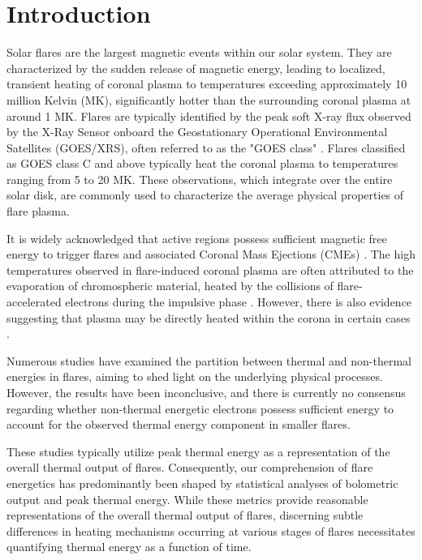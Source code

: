 \justifying

\section{Introduction} \label{sec:intro}

Solar flares are the largest magnetic events within our solar system. They are characterized by the sudden release of magnetic energy, leading to localized, transient heating of coronal plasma to temperatures exceeding approximately 10 million Kelvin (MK), significantly hotter than the surrounding coronal plasma at around 1 MK. Flares are typically identified by the peak soft X-ray flux observed by the X-Ray Sensor onboard the Geostationary Operational Environmental Satellites (GOES/XRS), often referred to as the "GOES class" \citep{xrs}. Flares classified as GOES class C and above typically heat the coronal plasma to temperatures ranging from 5 to 20 MK. These observations, which integrate over the entire solar disk, are commonly used to characterize the average physical properties of flare plasma.

It is widely acknowledged that active regions possess sufficient magnetic free energy to trigger flares and associated Coronal Mass Ejections (CMEs) \citep{emslie12, ash17}. The high temperatures observed in flare-induced coronal plasma are often attributed to the evaporation of chromospheric material, heated by the collisions of flare-accelerated electrons during the impulsive phase \citep{fletcher11}. However, there is also evidence suggesting that plasma may be directly heated within the corona in certain cases \citep[e.g.,][]{longcope11, reeves17}.

Numerous studies \citep{stosire07, emslie12, inglis14, warmuth16a, warmuth16b, ash17} have examined the partition between thermal and non-thermal energies in flares, aiming to shed light on the underlying physical processes. However, the results have been inconclusive, and there is currently no consensus regarding whether non-thermal energetic electrons possess sufficient energy to account for the observed thermal energy component in smaller flares.

These studies typically utilize peak thermal energy as a representation of the overall thermal output of flares. Consequently, our comprehension of flare energetics has predominantly been shaped by statistical analyses of bolometric output and peak thermal energy. While these metrics provide reasonable representations of the overall thermal output of flares, discerning subtle differences in heating mechanisms occurring at various stages of flares necessitates quantifying thermal energy as a function of time.

